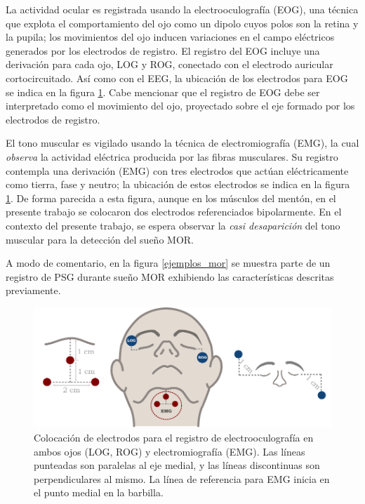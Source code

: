 \documentclass[12pt,letterpaper]{book}
\begin{document}
La actividad ocular es registrada usando la electrooculografía (EOG), una técnica que explota el comportamiento del ojo como un dipolo cuyos polos son la retina y la pupila; los movimientos del ojo inducen variaciones en el campo eléctricos generados por los electrodos de registro.
%
El registro del EOG incluye una derivación para cada ojo, LOG y ROG, conectado con el electrodo auricular cortocircuitado.
%
Así como con el EEG, la ubicación de los electrodos para EOG se indica en la figura \ref{emg_eog}.
%
Cabe mencionar que el registro de EOG debe ser interpretado como el movimiento del ojo, proyectado sobre el eje formado por los electrodos de registro.

El tono muscular es vigilado usando la técnica de electromiografía (EMG), la cual \textit{observa} la actividad eléctrica producida por las fibras musculares.
%
Su registro contempla una derivación (EMG) con tres electrodos que actúan eléctricamente como tierra, fase y neutro; la ubicación de estos electrodos se indica en la figura \ref{emg_eog}. De forma parecida a esta figura, aunque en los músculos del mentón, en el presente trabajo se colocaron dos electrodos referenciados bipolarmente.  
%
En el contexto del presente trabajo, se espera observar la \textit{casi desaparición} del tono muscular para la detección del sueño MOR.

A modo de comentario, en la figura \ref{ejemplos_mor} se muestra parte de un registro de PSG durante sueño MOR exhibiendo las características descritas previamente.

\begin{figure}
\centering
\includegraphics[width=\linewidth]
{./img_diagramas/emg_eog_v4.pdf}
\caption[Colocación de electrodos para electrooculografía y electromiografía]{Colocación de electrodos para el registro de electrooculografía en ambos ojos (LOG, ROG) y electromiografía (EMG). Las líneas punteadas son paralelas al eje medial, y las líneas discontinuas son perpendiculares al mismo. La línea de referencia para EMG inicia en el punto medial en la barbilla.}
\label{emg_eog}
\end{figure}
\end{document}
